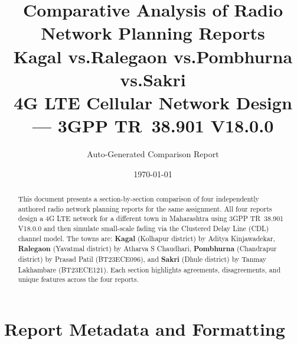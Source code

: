 \documentclass[11pt,a4paper]{article}
\title{\textbf{Comparative Analysis of Radio Network Planning Reports}\\[6pt]
\Large Kagal \quad vs.\quad Ralegaon \quad vs.\quad Pombhurna \quad vs.\quad Sakri\\[8pt]
\large 4G LTE Cellular Network Design --- 3GPP TR~38.901 V18.0.0}
\author{Auto-Generated Comparison Report}
\date{\today}
\begin{document}
\maketitle
\thispagestyle{empty}

\begin{abstract}
This document presents a section-by-section comparison of four independently authored radio network planning reports for the same assignment.
All four reports design a 4G LTE network for a different town in Maharashtra using 3GPP TR~38.901 V18.0.0 and then simulate small-scale fading via the Clustered Delay Line (CDL) channel model.
The towns are:
\textbf{Kagal} (Kolhapur district) by Aditya Kinjawadekar,
\textbf{Ralegaon} (Yavatmal district) by Atharva S Chaudhari,
\textbf{Pombhurna} (Chandrapur district) by Prasad Patil (BT23ECE096), and
\textbf{Sakri} (Dhule district) by Tanmay Lakhambare (BT23ECE121).
Each section highlights \colorbox{matchcolor}{agreements}, \colorbox{diffcolor}{disagreements}, and \colorbox{uniquecolor}{unique features}
across the four reports.
\end{abstract}

\tableofcontents
\newpage

\section{Report Metadata and Formatting}
\label{sec:meta}
\end{document}
